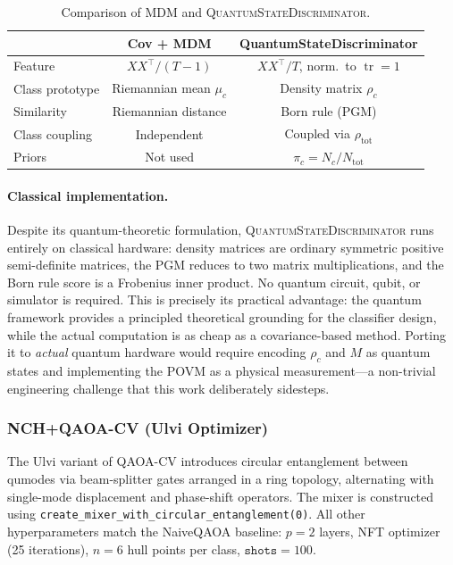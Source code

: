 \documentclass{article}
\newcommand{\tr}{\operatorname{tr}}
\begin{document}
\begin{table}[h]
  \caption{Comparison of MDM and \textsc{QuantumStateDiscriminator}.}
  \label{tab:qsd_vs_mdm}
  \centering
  \setlength{\tabcolsep}{4pt}
  \begin{tabular}{lcc}
    \toprule
     & Cov + MDM & QuantumStateDiscriminator \\
    \midrule
    Feature          & $XX^\top/(T{-}1)$          & $XX^\top/T$, norm.\ to $\tr=1$ \\
    Class prototype  & Riemannian mean $\mu_c$    & Density matrix $\rho_c$ \\
    Similarity       & Riemannian distance         & Born rule (PGM) \\
    Class coupling   & Independent                 & Coupled via $\rho_{\text{tot}}$ \\
    Priors           & Not used                    & $\pi_c = N_c/N_{\text{tot}}$ \\
    \bottomrule
  \end{tabular}
\end{table}

\paragraph{Classical implementation.}
Despite its quantum-theoretic formulation, \textsc{QuantumStateDiscriminator}
runs entirely on classical hardware: density matrices are ordinary symmetric
positive semi-definite matrices, the PGM reduces to two matrix
multiplications, and the Born rule score is a Frobenius inner product.
No quantum circuit, qubit, or simulator is required.
This is precisely its practical advantage: the quantum framework provides a
principled theoretical grounding for the classifier design, while the
actual computation is as cheap as a covariance-based method.
Porting it to \emph{actual} quantum hardware would require encoding $\rho_c$
and $M$ as quantum states and implementing the POVM as a physical
measurement---a non-trivial engineering challenge that this work deliberately
sidesteps.

\subsubsection{NCH+QAOA-CV (Ulvi Optimizer)}

The Ulvi variant of QAOA-CV introduces circular entanglement between qumodes
via beam-splitter gates arranged in a ring topology, alternating with
single-mode displacement and phase-shift operators.  The mixer is constructed
using \texttt{create\_mixer\_with\_circular\_entanglement(0)}.
All other hyperparameters match the NaiveQAOA baseline: $p=2$ layers,
NFT optimizer (25 iterations), $n=6$ hull points per class,
$\texttt{shots}=100$.
\end{document}
